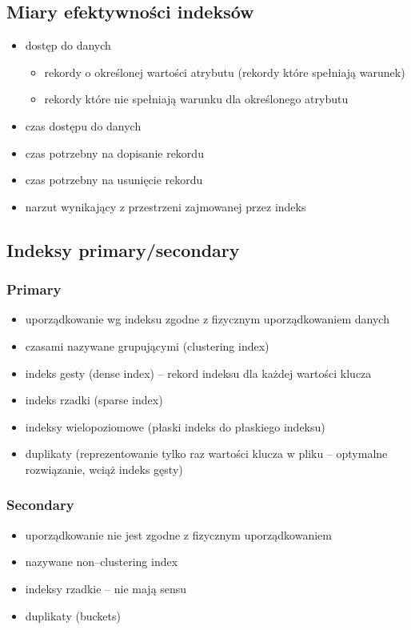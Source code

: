 \documentclass[12pt]{article}
\begin{document}
\subsection{Miary efektywności indeksów}

\begin{itemize}
\item dostęp do danych
\begin{itemize}
\item rekordy o określonej wartości atrybutu (rekordy które spełniają warunek)
\item rekordy które nie spełniają warunku dla określonego atrybutu
\end{itemize}
\item czas dostępu do danych
\item czas potrzebny na dopisanie rekordu
\item czas potrzebny na usunięcie rekordu
\item narzut wynikający z przestrzeni zajmowanej przez indeks
\end{itemize}

\subsection{Indeksy primary/secondary}

\subsubsection{Primary}
\begin{itemize}
\item uporządkowanie wg indeksu zgodne z fizycznym uporządkowaniem danych
\item czasami nazywane grupującymi (clustering index)
\item indeks gesty (dense index) -- rekord indeksu dla każdej wartości klucza
\item indeks rzadki (sparse index)
\item indeksy wielopoziomowe (płaski indeks do płaskiego indeksu)
\item duplikaty (reprezentowanie tylko raz wartości klucza w pliku -- optymalne rozwiązanie, wciąż indeks gęsty)
\end{itemize}
\subsubsection{Secondary}
\begin{itemize}
\item uporządkowanie nie jest zgodne z fizycznym uporządkowaniem
\item nazywane non--clustering index
\item indeksy rzadkie -- nie mają sensu
\item duplikaty (buckets)
\end{itemize}
\end{document}
